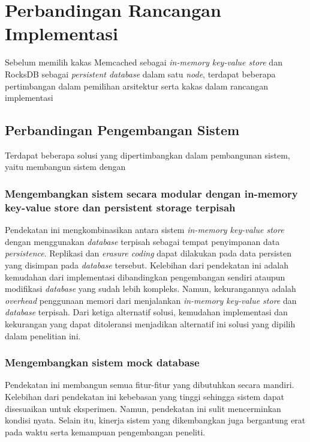 \chapter{Perbandingan Rancangan Implementasi}
\label{appendix:tools}

Sebelum memilih kakas Memcached sebagai \textit{in-memory key-value store} dan RocksDB sebagai \textit{persistent database} dalam satu \textit{node}, terdapat beberapa pertimbangan dalam pemilihan arsitektur serta kakas dalam rancangan implementasi

\section{Perbandingan Pengembangan Sistem}

Terdapat beberapa solusi yang dipertimbangkan dalam pembangunan sistem, yaitu membangun sistem dengan 

\subsection{Mengembangkan sistem secara modular dengan in-memory key-value store dan persistent storage terpisah}
Pendekatan ini mengkombinasikan antara sistem \textit{in-memory key-value store} dengan menggunakan \textit{database} terpisah sebagai tempat penyimpanan data \textit{persistence}. Replikasi dan \textit{erasure coding} dapat dilakukan pada data persisten yang disimpan pada \textit{database} tersebut. Kelebihan dari pendekatan ini adalah kemudahan dari implementasi dibandingkan pengembangan sendiri ataupun modifikasi \textit{database} yang sudah lebih kompleks. Namun, kekurangannya adalah \textit{overhead} penggunaan memori dari menjalankan \textit{in-memory key-value store} dan \textit{database} terpisah. Dari ketiga alternatif solusi, kemudahan implementasi dan kekurangan yang dapat ditoleransi menjadikan alternatif ini solusi yang dipilih dalam penelitian ini.

\subsection{Mengembangkan sistem mock database}
Pendekatan ini membangun semua fitur-fitur yang dibutuhkan secara mandiri. Kelebihan dari pendekatan ini kebebasan yang tinggi sehingga sistem dapat disesuaikan untuk eksperimen. Namun, pendekatan ini sulit mencerminkan kondisi nyata. Selain itu, kinerja sistem yang dikembangkan juga bergantung erat pada waktu serta kemampuan pengembangan peneliti.

